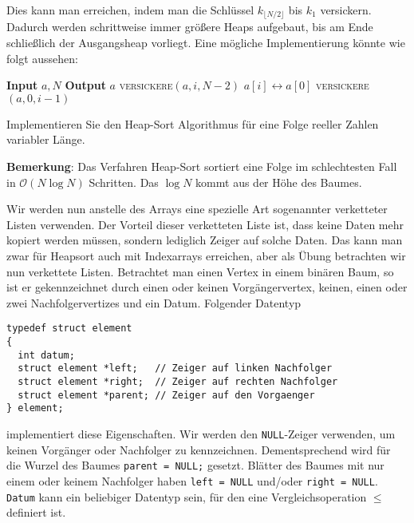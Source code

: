 \documentclass[tikz,12pt]{article}
\begin{document}
Dies kann man erreichen, indem man die Schlüssel $k_{\lfloor N/2\rfloor}$ bis $k_1$ versickern. 
Dadurch werden schrittweise immer größere Heaps aufgebaut, bis am Ende schließlich der Ausgangsheap vorliegt. 
Eine mögliche Implementierung könnte wie folgt aussehen:
\begin{algorithmic}[1]
  \State \textbf{Input} $a,N$
  \State \textbf{Output} $a$
  \State \textsc{versickere}$(a, i, N-2)$
  \EndFor
  \State $a[i]\leftrightarrow a[0]$
  \State \textsc{versickere}$(a, 0, i-1)$
  \EndFor
  \EndProcedure
\end{algorithmic}
Implementieren Sie den Heap-Sort Algorithmus für eine Folge reeller Zahlen variabler Länge.

\textbf{Bemerkung}: Das Verfahren Heap-Sort sortiert eine Folge im schlechtesten Fall in $\mathcal{O}(N\log N)$ Schritten.
Das $\log N$ kommt aus der Höhe des Baumes.

Wir werden nun anstelle des Arrays eine spezielle Art sogenannter verketteter Listen verwenden.
Der Vorteil dieser verketteten Liste ist, dass keine Daten mehr kopiert werden müssen, sondern lediglich Zeiger auf solche Daten.
Das kann man zwar für Heapsort auch mit Indexarrays erreichen, aber als Übung betrachten wir nun verkettete Listen.
Betrachtet man einen Vertex in einem binären Baum, so ist er gekennzeichnet durch einen oder keinen Vorgängervertex, keinen, einen oder zwei Nachfolgervertizes und ein Datum.
Folgender Datentyp 
\begin{lstlisting}
typedef struct element
{
  int datum;
  struct element *left;   // Zeiger auf linken Nachfolger
  struct element *right;  // Zeiger auf rechten Nachfolger
  struct element *parent; // Zeiger auf den Vorgaenger
} element;
\end{lstlisting}
implementiert diese Eigenschaften.
Wir werden den \texttt{NULL}-Zeiger verwenden, um keinen Vorgänger oder Nachfolger zu kennzeichnen.
Dementsprechend wird für die Wurzel des Baumes \texttt{parent = NULL;} gesetzt.
Blätter des Baumes mit nur einem oder keinem Nachfolger haben \texttt{left = NULL} und/oder \texttt{right = NULL}.
\texttt{Datum} kann ein beliebiger Datentyp sein, für den eine Vergleichsoperation $\leq$ definiert ist.
\end{document}
